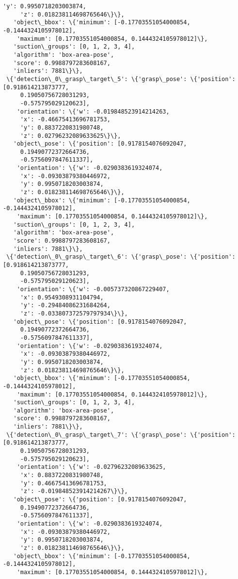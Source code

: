 \documentclass[11pt]{article}
\begin{document}
\begin{tcolorbox}[breakable, size=fbox, boxrule=.5pt, pad at break*=1mm, opacityfill=0]
\begin{Verbatim}[commandchars=\\\{\}]
     'y': 0.9950718203003874,
     'z': 0.018238114698765646\}\},
   'object\_bbox': \{'minimum': [-0.17703551054000854, -0.1444324105978012],
    'maximum': [0.17703551054000854, 0.1444324105978012]\},
   'suction\_groups': [0, 1, 2, 3, 4],
   'algorithm': 'box-area-pose',
   'score': 0.9988797283608167,
   'inliers': 7881\}\},
 \{'detection\_0\_grasp\_target\_5': \{'grasp\_pose': \{'position': [0.918614213873777,
     0.19050756728031293,
     -0.575795029120623],
    'orientation': \{'w': -0.019848523914214263,
     'x': -0.46675413696781753,
     'y': 0.8837220831980748,
     'z': 0.02796232089633625\}\},
   'object\_pose': \{'position': [0.9178154076092047,
     0.19490772372664736,
     -0.5756097847611337],
    'orientation': \{'w': -0.0290383619324074,
     'x': -0.09303879380446972,
     'y': 0.9950718203003874,
     'z': 0.018238114698765646\}\},
   'object\_bbox': \{'minimum': [-0.17703551054000854, -0.1444324105978012],
    'maximum': [0.17703551054000854, 0.1444324105978012]\},
   'suction\_groups': [0, 1, 2, 3, 4],
   'algorithm': 'box-area-pose',
   'score': 0.9988797283608167,
   'inliers': 7881\}\},
 \{'detection\_0\_grasp\_target\_6': \{'grasp\_pose': \{'position': [0.918614213873777,
     0.19050756728031293,
     -0.575795029120623],
    'orientation': \{'w': -0.005737320867229407,
     'x': 0.9549308931104794,
     'y': -0.29484086231684264,
     'z': -0.033807372579797934\}\},
   'object\_pose': \{'position': [0.9178154076092047,
     0.19490772372664736,
     -0.5756097847611337],
    'orientation': \{'w': -0.0290383619324074,
     'x': -0.09303879380446972,
     'y': 0.9950718203003874,
     'z': 0.018238114698765646\}\},
   'object\_bbox': \{'minimum': [-0.17703551054000854, -0.1444324105978012],
    'maximum': [0.17703551054000854, 0.1444324105978012]\},
   'suction\_groups': [0, 1, 2, 3, 4],
   'algorithm': 'box-area-pose',
   'score': 0.9988797283608167,
   'inliers': 7881\}\},
 \{'detection\_0\_grasp\_target\_7': \{'grasp\_pose': \{'position': [0.918614213873777,
     0.19050756728031293,
     -0.575795029120623],
    'orientation': \{'w': -0.02796232089633625,
     'x': 0.8837220831980748,
     'y': 0.46675413696781753,
     'z': -0.019848523914214267\}\},
   'object\_pose': \{'position': [0.9178154076092047,
     0.19490772372664736,
     -0.5756097847611337],
    'orientation': \{'w': -0.0290383619324074,
     'x': -0.09303879380446972,
     'y': 0.9950718203003874,
     'z': 0.018238114698765646\}\},
   'object\_bbox': \{'minimum': [-0.17703551054000854, -0.1444324105978012],
    'maximum': [0.17703551054000854, 0.1444324105978012]\},

\end{Verbatim}
\end{tcolorbox}
\end{document}
